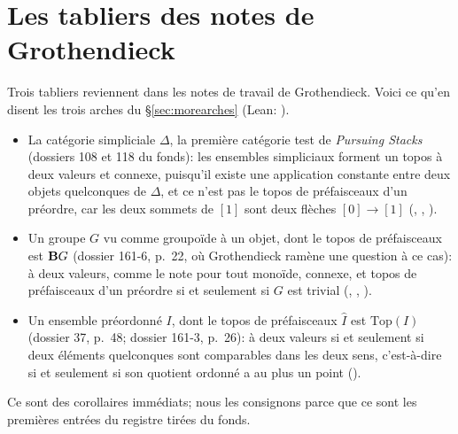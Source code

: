 \section{Les tabliers des notes de Grothendieck}\label{sec:grdecks}

Trois tabliers reviennent dans les notes de travail de Grothendieck. Voici ce qu'en disent les trois arches du \S\ref{sec:morearches} (Lean: ).
\begin{itemize}
\item La catégorie simpliciale $\Delta$, la première catégorie test de \emph{Pursuing Stacks} (dossiers 108 et 118 du fonds): les ensembles simpliciaux forment un topos à deux valeurs et connexe, puisqu'il existe une application constante entre deux objets quelconques de $\Delta$, et ce n'est pas le topos de préfaisceaux d'un préordre, car les deux sommets de $[1]$ sont deux flèches $[0]\to[1]$ (, , ).
\item Un groupe $G$ vu comme groupoïde à un objet, dont le topos de préfaisceaux est $\mathbf{B} G$ (dossier 161-6, p.~22, où Grothendieck ramène une question à ce cas): à deux valeurs, comme le note \cite[IV~8.4.3]{sga4} pour tout monoïde, connexe, et topos de préfaisceaux d'un préordre si et seulement si $G$ est trivial (, , ).
\item Un ensemble préordonné $I$, dont le topos de préfaisceaux $\widehat I$ est $\mathrm{Top}(I)$ (dossier 37, p.~48; dossier 161-3, p.~26): à deux valeurs si et seulement si deux éléments quelconques sont comparables dans les deux sens, c'est-à-dire si et seulement si son quotient ordonné a au plus un point ().
\end{itemize}
Ce sont des corollaires immédiats; nous les consignons parce que ce sont les premières entrées du registre tirées du fonds.
